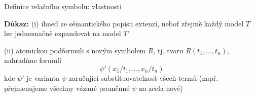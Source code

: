 \documentclass{beamer}
\begin{document}
\begin{frame}{Definice relačního symbolu: vlastnosti}
    
    \pause 

    \pause 
    \textbf{Důkaz:} \pause \alert{(i)} ihned ze sémantického popisu extenzí, neboť zřejmě každý model $T$ lze \alert{jednoznačně} expandovat na model $T'$

    \pause 
    \alert{(ii)} atomickou podformuli s novým symbolem $R$, tj. tvaru \alert{$R(t_1,\dots,t_n)$}, nahradíme formulí
    $$
    \psi'(x_1/t_1,\dots,x_n/t_n)
    $$\pause 
    kde $\psi'$ je \alert{varianta $\psi$ zaručující substituovatelnost} všech termů (např. přejmenujeme všechny vázané proměnné $\psi$ na zcela nové)\hfill\qedsymbol

\end{frame}
\end{document}
